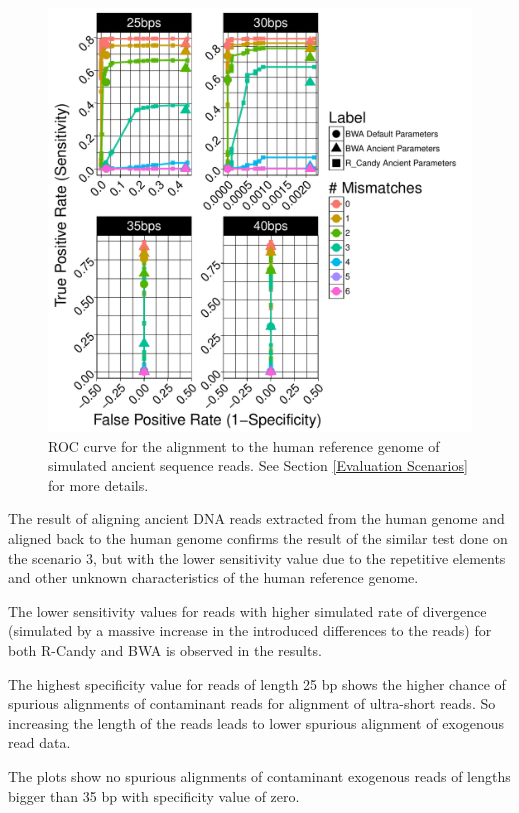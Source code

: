 \documentclass[11pt,a4paper]{report}
\begin{document}
\begin{figure}[H]
\centering
\includegraphics[width=12cm]{pictures/f_DS4_emp.pdf}

\caption{
ROC curve for the alignment to the human reference genome of simulated ancient
sequence reads. See Section \ref{Evaluation Scenarios} for more details.
}

\label{DS4_emp}
\end{figure}



The result of aligning ancient DNA reads extracted from the human genome
and aligned back to the human genome confirms the result of the similar
test done on the scenario 3, but with the lower sensitivity value due to 
the repetitive elements and other unknown characteristics of the human 
reference genome.

The lower sensitivity values for reads with higher simulated rate of 
divergence (simulated by a massive increase in the introduced differences
to the reads) for both R-Candy and BWA is observed in the results.

The highest specificity value for reads of length 25 bp shows the higher 
chance of spurious alignments of contaminant reads for alignment of 
ultra-short reads.
So increasing the length of the reads leads to lower spurious alignment 
of exogenous read data.

The plots show no spurious alignments of contaminant exogenous reads of 
lengths bigger than 35 bp with specificity value of zero.
\end{document}
